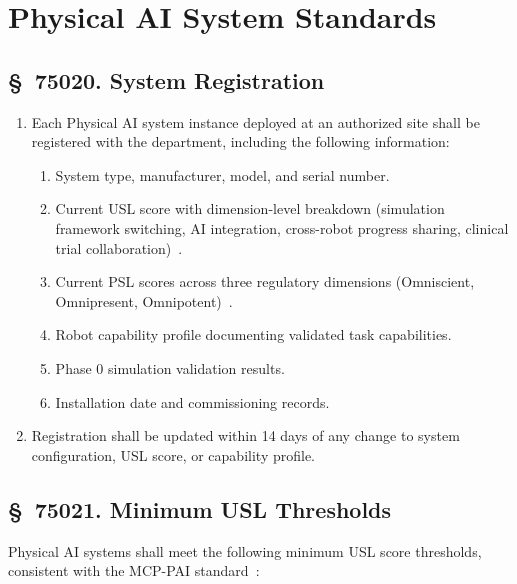 \documentclass[11pt,letterpaper]{article}
\begin{document}
\section{Physical AI System Standards}

\subsection{\S~75020. System Registration}

\begin{enumerate}[label=(\alph*)]
\item Each Physical AI system instance deployed at an authorized site shall be
  registered with the department, including the following information:
  \begin{enumerate}[label=(\arabic*)]
  \item System type, manufacturer, model, and serial number.
  \item Current USL score with dimension-level breakdown (simulation framework
    switching, AI integration, cross-robot progress sharing, clinical trial
    collaboration)~\cite{usl2026}.
  \item Current PSL scores across three regulatory dimensions (Omniscient,
    Omnipresent, Omnipotent)~\cite{pslframework2026}.
  \item Robot capability profile documenting validated task capabilities.
  \item Phase 0 simulation validation results.
  \item Installation date and commissioning records.
  \end{enumerate}

\item Registration shall be updated within 14 days of any change to system
  configuration, USL score, or capability profile.
\end{enumerate}

\subsection{\S~75021. Minimum USL Thresholds}

Physical AI systems shall meet the following minimum USL score thresholds,
consistent with the MCP-PAI standard~\cite{cfr50adapt}:
\end{document}
